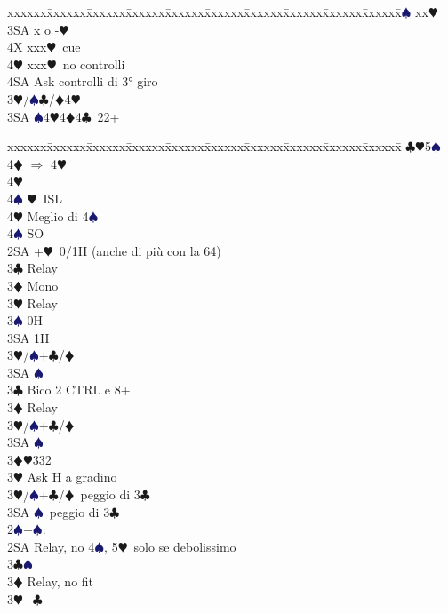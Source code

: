\documentclass[a4paper,italian]{article}
\newcommand{\BC}{\textcolor{OliveGreen}{$\clubsuit$}}
\newcommand{\BD}{\textcolor{RedOrange}{$\vardiamondsuit$}}
\newcommand{\BH}{\textcolor{Red2}{$\varheartsuit${}}}
\newcommand{\BS}{\textcolor{MidnightBlue}{$\spadesuit${}}}
\newenvironment{bidtable}
{\begin{tabbing}

    xxxxxx\=xxxxxx\=xxxxxx\=xxxxxx\=xxxxxx\=xxxxxx\=xxxxxx\=xxxxxx\=xxxxxx\=xxxxxx\=\kill}
{\end{tabbing} }%
\begin{document}
\begin{multicols}{2}
\begin{bidtable}
        3\BS \> xx\BH \\
        3SA \> x o -\BH \\
        4X \> xxx\BH\ cue\\
        4\BH \> xxx\BH\ no controlli\+\\
        4SA \>Ask controlli di 3° giro\-\-\\
        3\BH/\BS {}\BC /\BD 4\BH \\
        3SA \BS 4\BH 4\BD 4\BC\ 22+\\
    \end{bidtable}
    \vfill\null
    \columnbreak
    \begin{bidtable}
        \>\BC {}\BH 5\BS \+\+\+\\
        4\BD \> $\Rightarrow$ 4\BH \+\\
        4\BH\+\\
        4\BS \> \BH\ ISL\-\-\\
        4\BH \> Meglio di 4\BS \\
        4\BS \> SO\-\-\\
        2SA +\BH\ 0/1H (anche di più con la 64)\+\\
        3\BC \> Relay\+\\
        3\BD \> Mono\+\\
        3\BH \> Relay\+\\
        3\BS \> 0H\\
        3SA \> 1H\-\-\\
        3\BH/\BS {}+\BC /\BD \\
        3SA \BS \-\-\\
        3\BC \> Bico 2 CTRL e 8+\+\\
        3\BD \> Relay\+\\
        3\BH/\BS {}+\BC /\BD \\
        3SA \BS \-\-\\
        3\BD {}\BH 332\+\\
        3\BH \> Ask H a gradino\-\\
        3\BH/\BS {}+\BC /\BD\ peggio di 3\BC \\
        3SA \BS\ peggio di 3\BC \-\\
        2\BS {}+\BS :\+\\
        2SA \> Relay, no 4\BS , 5\BH\ solo se debolissimo\+\\
        3\BC {}\BS \+\\
        3\BD \> Relay, no fit\+\\
        3\BH {}+\BC \\

\end{bidtable}
\end{multicols}
\end{document}
